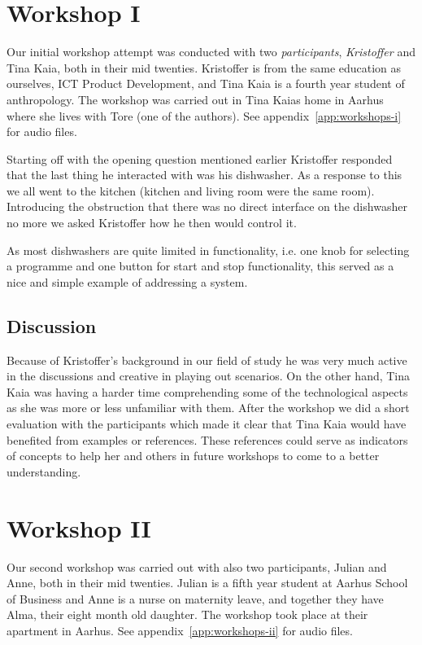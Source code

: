 \section{Workshop I}

Our initial workshop attempt was conducted with two \emph{participants}, \emph{Kristoffer} and Tina Kaia, both in their mid twenties.
Kristoffer is from the same education as ourselves, ICT Product Development, and Tina Kaia is a fourth year student of anthropology.
The workshop was carried out in Tina Kaias home in Aarhus where she lives with Tore (one of the authors).
See appendix~\ref{app:workshops-i} for  audio files.

Starting off with the opening question mentioned earlier Kristoffer responded that the last thing he interacted with was his dishwasher.
As a response to this we all went to the kitchen (kitchen and living room were the same room).
Introducing the obstruction that there was no direct interface on the dishwasher no more we asked Kristoffer how he then would control it.

As most dishwashers are quite limited in functionality, i.e. one knob for selecting a programme and one button for start and stop functionality, this served as a nice and simple example of addressing a system.

\subsection{Discussion}

Because of Kristoffer's background in our field of study he was very much active in the discussions and creative in playing out scenarios.
On the other hand, Tina Kaia was having a harder time comprehending some of the technological aspects as she was more or less unfamiliar with them.
After the workshop we did a short evaluation with the participants which made it clear that Tina Kaia would have benefited from examples or references.
These references could serve as indicators of concepts to help her and others in future workshops to come to a better understanding.

\section{Workshop II}

Our second workshop was carried out with also two participants, Julian and Anne, both in their mid twenties.
Julian is a fifth year student at Aarhus School of Business and Anne is a nurse on maternity leave, and together they have Alma, their eight month old daughter.
The workshop took place at their apartment in Aarhus.
See appendix~\ref{app:workshops-ii} for  audio files.


